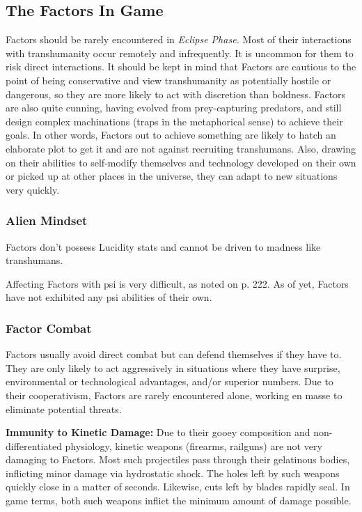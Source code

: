 \subsection{The Factors In Game }

Factors should be rarely encountered in \textit{Eclipse Phase.}
Most of their interactions with transhumanity occur 
remotely and infrequently. It is uncommon for them to 
risk direct interactions. It should be kept in mind that 
Factors are cautious to the point of being conservative
and view transhumanity as potentially hostile or
dangerous, so they are more likely to act with discretion
than boldness. Factors are also quite cunning,
having evolved from prey-capturing predators, and 
still design complex machinations (traps in the metaphorical
sense) to achieve their goals. In other words,
Factors out to achieve something are likely to hatch an 
elaborate plot to get it and are not against recruiting 
transhumans. Also, drawing on their abilities to self-modify
themselves and technology developed on their
own or picked up at other places in the universe, they 
can adapt to new situations very quickly. 

\subsubsection{Alien Mindset}

Factors don't possess Lucidity stats and cannot be 
driven to madness like transhumans.

Affecting Factors with psi is very difficult, as noted 
on p. 222. As of yet, Factors have not exhibited any 
psi abilities of their own.

\subsubsection{Factor Combat }

Factors usually avoid direct combat but can defend 
themselves if they have to. They are only likely to act 
aggressively in situations where they have surprise, 
environmental or technological advantages, and/or 
superior numbers. Due to their cooperativism, Factors
are rarely encountered alone, working en masse
to eliminate potential threats.

\textbf{Immunity to Kinetic Damage: }Due to their gooey 
composition and non-differentiated physiology, kinetic
weapons (firearms, railguns) are not very damaging
to Factors. Most such projectiles pass through their 
gelatinous bodies, inflicting minor damage via hydrostatic
shock. The holes left by such weapons quickly
close in a matter of seconds. Likewise, cuts left by 
blades rapidly seal. In game terms, both such weapons 
inflict the minimum amount of damage possible. 

